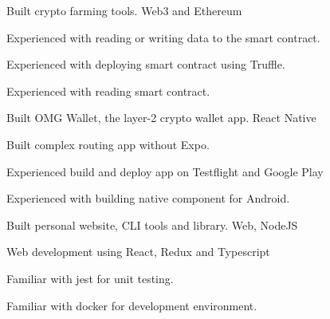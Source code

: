 

\begin{cventries}


  \cventry
    {Built crypto farming tools.} %
    {Web3 and Ethereum} %
    {} %
    {} %
    {
      \begin{cvitems} %
        \item {Experienced with reading or writing data to the smart contract.}
        \item {Experienced with deploying smart contract using Truffle.}
        \item {Experienced with reading smart contract.}
      \end{cvitems}
    }

  \cventry
    {Built OMG Wallet, the layer-2 crypto wallet app.} %
    {React Native} %
    {} %
    {} %
    {
      \begin{cvitems} %
        \item {Built complex routing app without Expo.}
        \item {Experienced build and deploy app on Testflight and Google Play}
        \item {Experienced with building native component for Android.}
      \end{cvitems}
    }

  \cventry
    {Built personal website, CLI tools and library. } %
    {Web, NodeJS} %
    {} %
    {} %
    {
      \begin{cvitems} %
        \item {Web development using React, Redux and Typescript}
        \item {Familiar with jest for unit testing.}
        \item {Familiar with docker for development environment.}
      \end{cvitems}
    }


\end{cventries}
